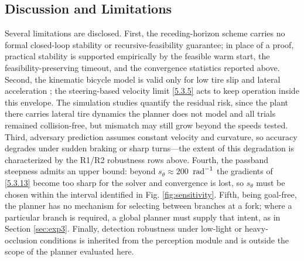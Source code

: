 \documentclass[journal]{IEEEtran}
\begin{document}
\subsection{Discussion and Limitations}\label{sec:limitations}
Several limitations are disclosed. First, the receding-horizon scheme carries no formal closed-loop stability or recursive-feasibility guarantee; in place of a proof, practical stability is supported empirically by the feasible warm start, the feasibility-preserving timeout, and the convergence statistics reported above. Second, the kinematic bicycle model is valid only for low tire slip and lateral acceleration \cite{Polack2017}; the steering-based velocity limit \eqref{5.3.5} acts to keep operation inside this envelope. The simulation studies quantify the residual risk, since the plant there carries lateral tire dynamics the planner does not model and all trials remained collision-free, but mismatch may still grow beyond the speeds tested. Third, adversary prediction assumes constant velocity and curvature, so accuracy degrades under sudden braking or sharp turns---the extent of this degradation is characterized by the R1/R2 robustness rows above. Fourth, the passband steepness admits an upper bound: beyond $s_\theta\approx200$~$\textup{rad}^{-1}$ the gradients of \eqref{5.3.13} become too sharp for the solver and convergence is lost, so $s_\theta$ must be chosen within the interval identified in Fig. \ref{fig:sensitivity}. Fifth, being goal-free, the planner has no mechanism for selecting between branches at a fork; where a particular branch is required, a global planner must supply that intent, as in Section \ref{sec:exp3}. Finally, detection robustness under low-light or heavy-occlusion conditions is inherited from the perception module and is outside the scope of the planner evaluated here.
\end{document}
